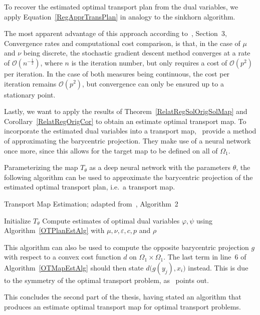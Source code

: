 To recover the estimated optimal transport plan from the dual variables, we apply Equation~\ref{RegApprTransPlan} in analogy to the sinkhorn algorithm.

The most apparent advantage of this approach according to~\cite{Seg2018}, Section~3, Convergence rates and computational cost comparison, is that, in the case of $\mu$ and $\nu$ being discrete, the stochastic gradient descent method converges at a rate of $\mathcal{O}\left( n^{-\frac{1}{2}} \right)$, where $n$ is the iteration number, but only requires a cost of $\mathcal{O}(p^2)$ per iteration. In the case of both measures being continuous, the cost per iteration remains $\mathcal{O}(p^2)$, but convergence can only be ensured up to a stationary point.

Lastly, we want to apply the results of Theorem~\ref{RelatRegSolOrigSolMap} and Corollary~\ref{RelatRegOrigCor} to obtain an estimate optimal transport map. To incorporate the estimated dual variables into a transport map,~\cite{Seg2018} provide a method of approximating the barycentric projection. They make use of a neural network once more, since this allows for the target map to be defined on all of $\Omega_1$.

Parameterizing the map $T_\theta$ as a deep neural network with the parameters $\theta$, the following algorithm can be used to approximate the barycentric projection of the estimated optimal transport plan, i.e.\ a transport map.

\begin{algorithm}\label{OTMapEstAlg}
	\caption{Transport Map Estimation; adapted from~\cite{Seg2018}, Algorithm~2}
	Initialize $T_\theta$\;
	Compute estimates of optimal dual variables $\varphi, \psi$ using Algorithm~\ref{OTPlanEstAlg} with $\mu, \nu, \varepsilon, c, p$ and $\rho$\;
\end{algorithm}

This algorithm can also be used to compute the opposite barycentric projection $g$ with respect to a convex cost function $d$ on $\Omega_1 \times \Omega_1$. The last term in line~6 of Algorithm~\ref{OTMapEstAlg} should then state $d\big( g(y_j), x_i \big)$ instead. This is due to the symmetry of the optimal transport problem, as~\cite{Seg2018} points out.

This concludes the second part of the thesis, having stated an algorithm that produces an estimate optimal transport map for optimal transport problems.